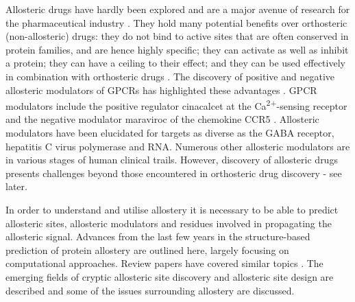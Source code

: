 Allosteric drugs have hardly been explored and are a major avenue of research for the pharmaceutical industry \cite{Wenthur2014}.
They hold many potential benefits over orthosteric (non-allosteric) drugs: they do not bind to active sites that are often conserved in protein families, and are hence highly specific; they can activate as well as inhibit a protein; they can have a ceiling to their effect; and they can be used effectively in combination with orthosteric drugs \cite{Wenthur2014}.
The discovery of positive and negative allosteric modulators of GPCRs has highlighted these advantages \cite{Wootten2013, Conn2009}.
GPCR modulators include the positive regulator cinacalcet at the Ca\textsuperscript{2+}-sensing receptor and the negative modulator maraviroc of the chemokine CCR5 \cite{Nussinov2013}.
Allosteric modulators have been elucidated for targets as diverse as the GABA receptor, hepatitis C virus polymerase and RNA.
Numerous other allosteric modulators are in various stages of human clinical trails.
However, discovery of allosteric drugs presents challenges beyond those encountered in orthosteric drug discovery - see later.

In order to understand and utilise allostery it is necessary to be able to predict allosteric sites, allosteric modulators and residues involved in propagating the allosteric signal.
Advances from the last few years in the structure-based prediction of protein allostery are outlined here, largely focusing on computational approaches.
Review papers have covered similar topics \cite{SchuelerFurman2016, Wagner2016, Guarnera2016, Lu2014}.
The emerging fields of cryptic allosteric site discovery and allosteric site design are described and some of the issues surrounding allostery are discussed.


